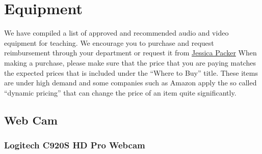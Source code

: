 \chapter{Equipment}
\label{ch:equipment}

We have compiled a list of approved and recommended audio and video
equipment for teaching.
%
We encourage you to purchase and request reimbursement through your department or request it from \href{mailto:jpacker@andrew.cmu.edu}{Jessica Packer}
%
When making a purchase, please make sure that the price that you are paying matches the expected prices that is included under the ``Where to Buy'' title.  
%
These items are under high demand and some companies such as Amazon apply the so called ``dynamic pricing'' that can change the price of an item quite significantly.
 

\section{Web Cam}

\subsection{Logitech C920S HD Pro Webcam}

